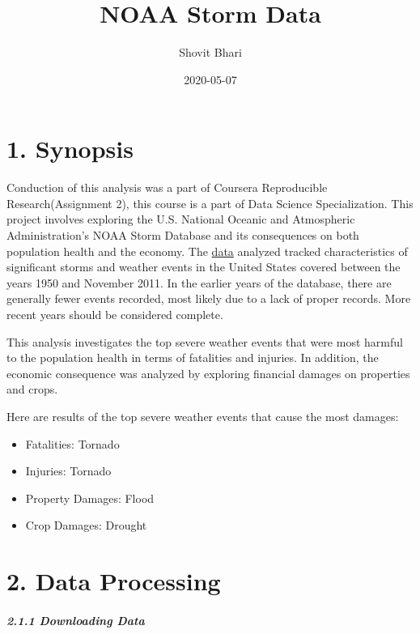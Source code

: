\documentclass[]{article}
\title{NOAA Storm Data}
\author{Shovit Bhari}
\date{2020-05-07}
\providecommand{\tightlist}{%
  \setlength{\itemsep}{0pt}\setlength{\parskip}{0pt}}
\let\oldsubparagraph\subparagraph
\renewcommand{\subparagraph}[1]{\oldsubparagraph{#1}\mbox{}}
\begin{document}
\maketitle

\hypertarget{synopsis}{%
\section{1. Synopsis}\label{synopsis}}

Conduction of this analysis was a part of Coursera Reproducible
Research(Assignment 2), this course is a part of Data Science
Specialization. This project involves exploring the U.S. National
Oceanic and Atmospheric Administration's NOAA Storm Database and its
consequences on both population health and the economy. The
\href{https://d396qusza40orc.cloudfront.net/repdata\%2Fdata\%2FStormData.csv.bz2}{data}
analyzed tracked characteristics of significant storms and weather
events in the United States covered between the years 1950 and November
2011. In the earlier years of the database, there are generally fewer
events recorded, most likely due to a lack of proper records. More
recent years should be considered complete.

This analysis investigates the top severe weather events that were most
harmful to the population health in terms of fatalities and injuries. In
addition, the economic consequence was analyzed by exploring financial
damages on properties and crops.

Here are results of the top severe weather events that cause the most
damages:

\begin{itemize}
\tightlist
\item
  Fatalities: Tornado\\
\item
  Injuries: Tornado\\
\item
  Property Damages: Flood\\
\item
  Crop Damages: Drought
\end{itemize}

\hypertarget{data-processing}{%
\section{2. Data Processing}\label{data-processing}}

\hypertarget{downloading-data}{%
\subparagraph{2.1.1 Downloading Data}\label{downloading-data}}
\end{document}
